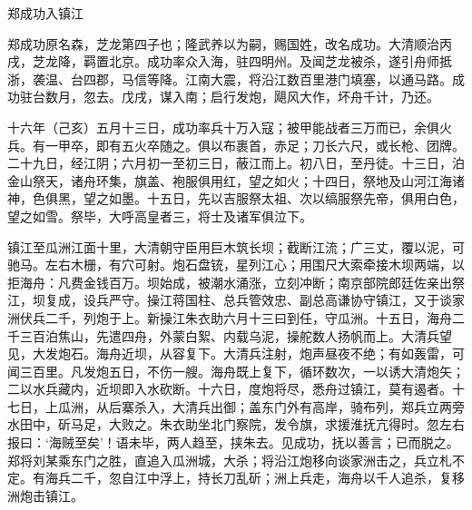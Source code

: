 \documentclass[]{article}
\begin{document}
郑成功入镇江

郑成功原名森，芝龙第四子也；隆武养以为嗣，赐国姓，改名成功。大清顺治丙戌，芝龙降，羁置北京。成功率众入海，驻四明州。及闻芝龙被杀，遂引舟师抵浙，袭温、台四郡，马信等降。江南大震，将沿江数百里港门填塞，以通马路。成功驻台数月，忽去。戊戌，谋入南；启行发炮，飓风大作，坏舟千计，乃还。

十六年（己亥）五月十三日，成功率兵十万入寇；被甲能战者三万而已，余俱火兵。有一甲卒，即有五火卒随之。俱以布裹首，赤足；刀长六尺，或长枪、团牌。二十九日，经江阴；六月初一至初三日，蔽江而上。初八日，至丹徒。十三日，泊金山祭天，诸舟环集，旗盖、袍服俱用红，望之如火；十四日，祭地及山河江海诸神，色俱黑，望之如墨。十五日，先以吉服祭太祖、次以缟服祭先帝，俱用白色，望之如雪。祭毕，大呼高皇者三，将士及诸军俱泣下。

镇江至瓜洲江面十里，大清朝守臣用巨木筑长坝；截断江流；广三丈，覆以泥，可驰马。左右木栅，有穴可射。炮石盘铳，星列江心；用围尺大索牵接木坝两端，以拒海舟：凡费金钱百万。坝始成，被潮水涌涨，立刻冲断；南京部院郎廷佐亲出祭江，坝复成，设兵严守。操江蒋国柱、总兵管效忠、副总高谦协守镇江，又于谈家洲伏兵二千，列炮于上。新操江朱衣助六月十三曰到任，守瓜洲。十五日，海舟二千三百泊焦山，先遣四舟，外蒙白絮、内载乌泥，操舵数人扬帆而上。大清兵望见，大发炮石。海舟近坝，从容复下。大清兵注射，炮声昼夜不绝；有如轰雷，可闻三百里。凡发炮五日，不伤一艘。海舟既上复下，循环数次，一以诱大清炮矢；二以水兵藏内，近坝即入水砍断。十六日，度炮将尽，悉舟过镇江，莫有遏者。十七日，上瓜洲，从后寨杀入，大清兵出御；盖东门外有高岸，骑布列，郑兵立两旁水田中，斫马足，大败之。朱衣助坐北门察院，发令旗，求援淮抚亢得时。忽左右报曰：`海贼至矣'！语未毕，两人趋至，挟朱去。见成功，抚以善言；已而脱之。郑将刘某乘东门之胜，直追入瓜洲城，大杀；将沿江炮移向谈家洲击之，兵立札不定。有海兵二千，忽自江中浮上，持长刀乱斫；洲上兵走，海舟以千人追杀，复移洲炮击镇江。
\end{document}
